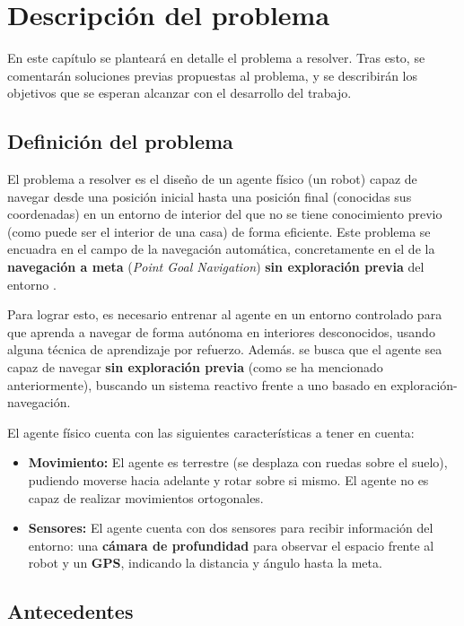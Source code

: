 \chapter{Descripción del problema}

En este capítulo se planteará en detalle el problema a resolver. Tras esto, se comentarán soluciones previas propuestas al problema, y se describirán los objetivos que se esperan alcanzar con el desarrollo del trabajo. 

\section{Definición del problema}

El problema a resolver es el diseño de un agente físico (un robot) capaz de navegar desde una posición inicial hasta una posición final (conocidas sus coordenadas) en un entorno de interior del que no se tiene conocimiento previo (como puede ser el interior de una casa) de forma eficiente. Este problema se encuadra en el campo de la navegación automática, concretamente en el de la \textbf{navegación a meta} (\textit{Point Goal Navigation}) \textbf{sin exploración previa} del entorno \cite{DBLP:journals/corr/abs-1807-06757}.

Para lograr esto, es necesario entrenar al agente en un entorno controlado para que aprenda a navegar de forma autónoma en interiores desconocidos, usando alguna técnica de aprendizaje por refuerzo. Además. se busca que el agente sea capaz de navegar \textbf{sin exploración previa} (como se ha mencionado anteriormente), buscando un sistema reactivo frente a uno basado en exploración-navegación.

El agente físico cuenta con las siguientes características a tener en cuenta:
\begin{itemize}
	\item \textbf{Movimiento:} El agente es terrestre (se desplaza con ruedas sobre el suelo), pudiendo moverse hacia adelante y rotar sobre si mismo. El agente no es capaz de realizar movimientos ortogonales.
	\item \textbf{Sensores:} El agente cuenta con dos sensores para recibir información del entorno: una \textbf{cámara de profundidad} para observar el espacio frente al robot y un \textbf{GPS}, indicando la distancia y ángulo hasta la meta.
\end{itemize}

\section{Antecedentes}

